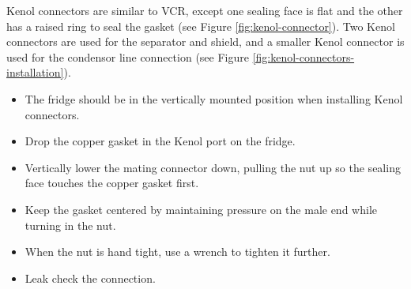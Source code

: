 Kenol connectors are similar to VCR, except one sealing face is flat and the other has a raised ring to seal the gasket (see Figure \ref{fig:kenol-connector}).  Two Kenol connectors are used for the separator and shield, and a smaller Kenol connector is used for the \het{} condensor line connection (see Figure \ref{fig:kenol-connectors-installation}).

\begin{itemize}
 \item The fridge should be in the vertically mounted position when installing Kenol connectors.
 \item Drop the copper gasket in the Kenol port on the fridge.
 \item Vertically lower the mating connector down, pulling the nut up so the sealing face touches the copper gasket first.
 \item Keep the gasket centered by maintaining pressure on the male end while turning in the nut.
 \item When the nut is hand tight, use a wrench to tighten it further.
 \item Leak check the connection.
\end{itemize}

